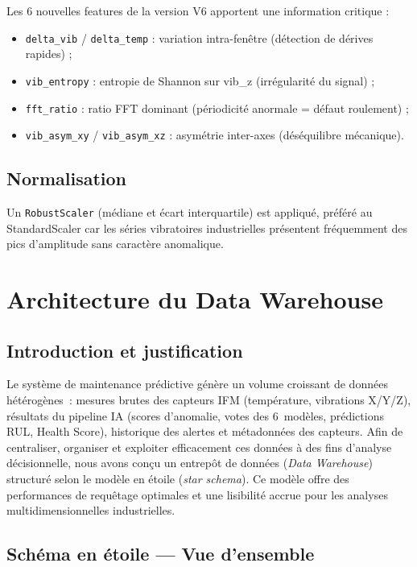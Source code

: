 \documentclass[12pt,a4paper]{report}
\begin{document}
Les 6 nouvelles features de la version V6 apportent une information critique :
\begin{itemize}
  \item \texttt{delta\_vib} / \texttt{delta\_temp} : variation intra-fenêtre (détection de dérives rapides) ;
  \item \texttt{vib\_entropy} : entropie de Shannon sur vib\_z (irrégularité du signal) ;
  \item \texttt{fft\_ratio} : ratio FFT dominant (périodicité anormale = défaut roulement) ;
  \item \texttt{vib\_asym\_xy} / \texttt{vib\_asym\_xz} : asymétrie inter-axes (déséquilibre mécanique).
\end{itemize}

\subsection{Normalisation}

Un \texttt{RobustScaler} (médiane et écart interquartile) est appliqué, préféré au StandardScaler car les séries vibratoires industrielles présentent fréquemment des pics d'amplitude sans caractère anomalique.

\section{Architecture du Data Warehouse}
\label{sec:dw}

\subsection{Introduction et justification}

Le système de maintenance prédictive génère un volume croissant de données
hétérogènes~: mesures brutes des capteurs IFM (température, vibrations X/Y/Z),
résultats du pipeline IA (scores d'anomalie, votes des 6~modèles, prédictions
RUL, Health Score), historique des alertes et métadonnées des capteurs.
Afin de centraliser, organiser et exploiter efficacement ces données à des fins
d'analyse décisionnelle, nous avons conçu un entrepôt de données
(\textit{Data Warehouse}) structuré selon le modèle en étoile
(\textit{star schema}). Ce modèle offre des performances de requêtage optimales
et une lisibilité accrue pour les analyses multidimensionnelles industrielles.

\subsection{Schéma en étoile --- Vue d'ensemble}
\end{document}
